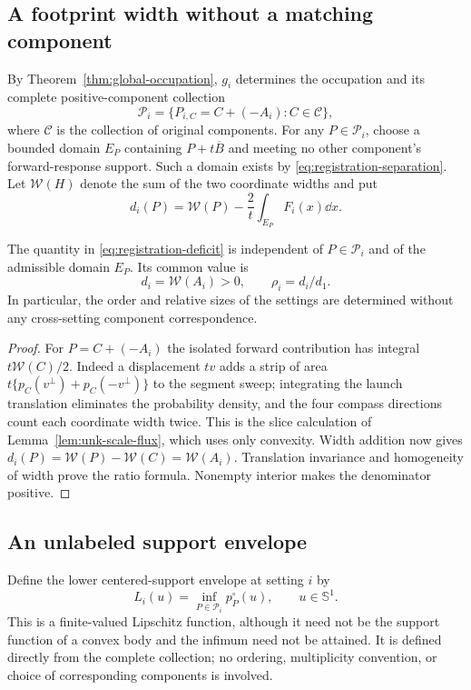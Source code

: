\subsection{A footprint width without a matching component}
By Theorem~\ref{thm:global-occupation}, $g_i$ determines the occupation
and its complete positive-component collection
\[
               \mathcal P_i=\{P_{i,C}=C+(-A_i):C\in\mathcal C\},
\]
where $\mathcal C$ is the collection of original components.
For any $P\in\mathcal P_i$, choose a bounded domain $E_P$ containing
$P+t\overline B$ and meeting no other component's forward-response
support. Such a domain exists by \eqref{eq:registration-separation}.
Let $\mathcal W(H)$ denote the sum of the two coordinate widths and put
\begin{equation}\label{eq:registration-deficit}
 d_i(P)=\mathcal W(P)-\frac2t\int_{E_P}F_i(x)\dd x.
\end{equation}

\begin{lemma}
\label{lem:registration-deficit}
The quantity in \eqref{eq:registration-deficit} is independent of
$P\in\mathcal P_i$ and of the admissible domain $E_P$. Its common
value is
\begin{equation}\label{eq:registration-width-ratio}
              d_i=\mathcal W(A_i)>0,
              \qquad \rho_i=d_i/d_1.
\end{equation}
In particular, the order and relative sizes of the settings are
determined without any cross-setting component correspondence.
\end{lemma}
\begin{proof}
For $P=C+(-A_i)$ the isolated forward contribution has integral
$t\mathcal W(C)/2$. Indeed a displacement $tv$ adds a strip of area
$t\{p_C(v^\perp)+p_C(-v^\perp)\}$ to the segment sweep; integrating
the launch translation eliminates the probability density, and the
four compass directions count each coordinate width twice. This is
the slice calculation of Lemma~\ref{lem:unk-scale-flux}, which uses
only convexity. Width addition now gives
$d_i(P)=\mathcal W(P)-\mathcal W(C)=\mathcal W(A_i)$.
Translation invariance and homogeneity of width prove the ratio
formula. Nonempty interior makes the denominator positive.
\end{proof}

\subsection{An unlabeled support envelope}
Define the lower centered-support envelope at setting $i$ by
\begin{equation}\label{eq:registration-envelope}
       L_i(u)=\inf_{P\in\mathcal P_i}p_P^\circ(u),
                   \qquad u\in\mathbb S^1.
\end{equation}
This is a finite-valued Lipschitz function, although it need not be
the support function of a convex body and the infimum need not be
attained. It is defined directly from the complete collection; no
ordering, multiplicity convention, or choice of corresponding
components is involved.

